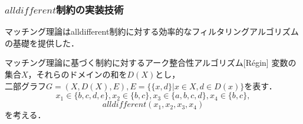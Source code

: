 \documentclass [dvipdfmx,11pt]{beamer}
\newcommand{\alldifferent}{$alldifferent$}
\begin{document}
\begin{frame}
    \frametitle{{\alldifferent}制約の実装技術}
    マッチング理論はalldifferent制約に対する効率的なフィルタリングアルゴリズムの基礎を提供した．\\

    \begin{block}{マッチング理論に基づく{\alldiff}制約に対するアーク整合性アルゴリズム[Régin]}
        変数の集合$X$，それらのドメインの和を$D(X)$とし，\\
        二部グラフ$G = (X, D(X), E), E = \{\{x, d\} | x \in X, d \in D(x)\}$を表す．
        \[
            x_1 \in \{b, c, d, e\}, x_2 \in \{b, c\}, x_3 \in \{a, b, c, d\}, x_4 \in \{b, c\},
        \]
        \[
            alldifferent(x_1, x_2, x_3, x_4)
        \]
        を考える．
    \end{block}
\end{frame}
\end{document}
